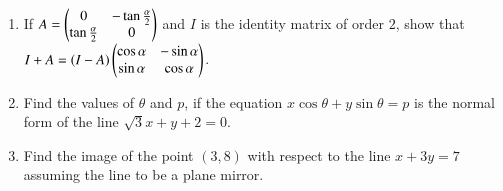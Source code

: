 \begin{enumerate}[label=\thesubsection.\arabic*,ref=\thesubsection.\theenumi]
\item If $A=\begin{pmatrix}0 & -\tan \frac{\alpha}{2} \\ \tan \frac{\alpha}{2} & 0\end{pmatrix}$  and $I$ is the identity matrix of order $2$, show that $I+A= (I-A) \begin{pmatrix}\cos \alpha & -\sin \alpha \\ \sin \alpha & \cos \alpha\end{pmatrix}$.
\item Find the values of $\theta$ and $p$, if the equation $x \cos \theta + y \sin \theta = p$ is the normal form of the line $\sqrt 3x+y+2=0$.
\item Find the image of the point $(3,8)$ with respect to the line $x+3y=7$ assuming the line to be a plane mirror.
\end{enumerate}
